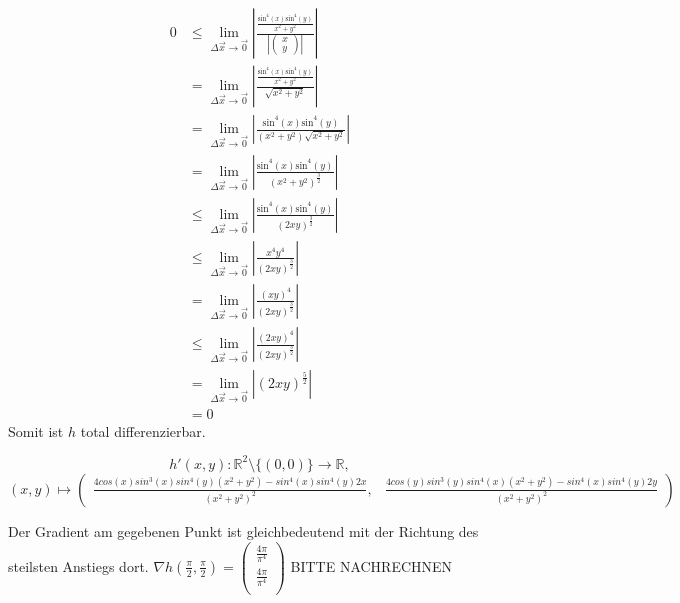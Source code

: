 \documentclass[10pt,a4paper,parskip=half]{scrartcl}
\newcommand{\vectwo}[2]{\left(\begin {array} {c}#1\\#2\\\end {array} \right)}
\begin{document}
\begin{enumerate}[(i)]
\begin{align*}
0 &\le\lim_{\Delta \vec x \to \vec 0} \left|\frac{\frac{\text{sin}^4(x)\text{sin}^4(y)}{x^2 + y^2}}{\left|\begin{pmatrix}x\\y\end{pmatrix} \right|}\right| \\
&= \lim_{\Delta \vec x \to \vec 0} \left|\frac{\frac{\text{sin}^4(x)\text{sin}^4(y)}{x^2 + y^2}}{\sqrt{x^2+y^2}}\right| \\
&= \lim_{\Delta \vec x \to \vec 0} \left|\frac{\text{sin}^4(x)\text{sin}^4(y)}{(x^2 + y^2)\sqrt{x^2+y^2}}\right| \\
&= \lim_{\Delta \vec x \to \vec 0} \left|\frac{\text{sin}^4(x)\text{sin}^4(y)}{(x^2 + y^2)^{\frac{3}{2}}}\right| \\
&\le \lim_{\Delta \vec x \to \vec 0} \left|\frac{\text{sin}^4(x)\text{sin}^4(y)}{(2xy)^{\frac{3}{2}}}\right| \\
&\le \lim_{\Delta \vec x \to \vec 0} \left|\frac{x^4y^4}{(2xy)^{\frac{3}{2}}}\right| \\
&= \lim_{\Delta \vec x \to \vec 0} \left|\frac{(xy)^4}{(2xy)^{\frac{3}{2}}}\right| \\
&\le \lim_{\Delta \vec x \to \vec 0} \left|\frac{(2xy)^4}{(2xy)^{\frac{3}{2}}}\right| \\
&= \lim_{\Delta \vec x \to \vec 0} \left|(2xy)^{\frac{5}{2}}\right| \\
&= 0
\end{align*}
Somit ist $h$ total differenzierbar.

\[
h'(x,y): \mathbb{R}^2\setminus{\{(0,0)\}} \to \mathbb{R}, 
\]
\[
(x,y) \mapsto \left( \begin{array}{cc} 
\frac{4cos(x)sin^3(x)sin^4(y)(x^2 + y^2) - sin^4(x)sin^4(y)2x}{(x^2 + y^2)^2}, &
\frac{4cos(y)sin^3(y)sin^4(x)(x^2 + y^2) - sin^4(x)sin^4(y)2y}{(x^2 + y^2)^2}
\end{array}\right)
\]

Der Gradient am gegebenen Punkt ist gleichbedeutend mit der Richtung des steilsten Anstiegs dort. \(\nabla h(\frac{\pi}{2},\frac{\pi}{2}) = \vectwo{\frac{4\pi}{\pi^4}}{\frac{4\pi}{\pi^4}}\) BITTE NACHRECHNEN


\end{enumerate}
\end{document}
